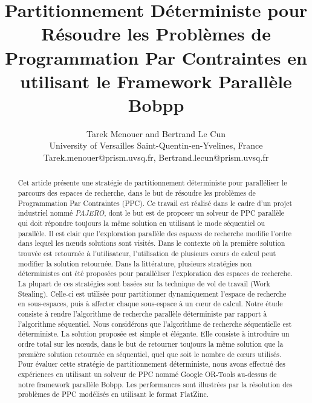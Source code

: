 \documentclass[parallelisme]{compas2014}
\begin{document}
\title{Partitionnement Déterministe pour Résoudre les Problèmes de Programmation Par Contraintes en utilisant le Framework Parallèle Bobpp}
\author{
Tarek Menouer and Bertrand Le Cun\\
University of Versailles Saint-Quentin-en-Yvelines, France \\
Tarek.menouer@prism.uvsq.fr, Bertrand.lecun@prism.uvsq.fr
}

\maketitle

\begin{abstract}
Cet article présente une stratégie de partitionnement déterministe pour paralléliser le parcours des espaces de recherche, dans le but de résoudre les problèmes de Programmation Par Contraintes (PPC). Ce travail est réalisé dans le cadre d'un projet industriel nommé \textit{PAJERO}, dont le but est de proposer un solveur de PPC parallèle qui doit répondre toujours la même solution en utilisant le mode séquentiel ou parallèle.
Il est clair que l'exploration parallèle des espaces de recherche modifie l'ordre dans lequel les nœuds solutions sont visités.
Dans le contexte où la première solution trouvée est retournée à l'utilisateur, l'utilisation de plusieurs cœurs de calcul peut modifier la solution retournée.
Dans la littérature, plusieurs stratégies non déterministes ont été proposées pour paralléliser l'exploration des espaces de recherche. La plupart de ces stratégies sont basées sur la technique de vol de travail (Work Stealing). Celle-ci est utilisée pour partitionner dynamiquement l'espace de recherche en sous-espaces, puis à affecter chaque sous-espace à un cœur de calcul.
Notre étude consiste à rendre l'algorithme de recherche parallèle déterministe par rapport à l'algorithme séquentiel.
Nous considérons que l'algorithme de recherche séquentielle est déterministe. La solution proposée est simple et élégante. Elle consiste à introduire un ordre total sur les nœuds, dans le but de retourner toujours la même solution que la première solution retournée en séquentiel, quel que soit le nombre de cœurs utilisés.
Pour évaluer cette stratégie de partitionnement déterministe, nous avons effectué des expériences en utilisant un solveur de PPC nommé Google OR-Tools au-dessus de notre framework parallèle Bobpp. Les performances sont illustrées par la résolution des problèmes de PPC modélisés en utilisant le format FlatZinc.

\end{abstract}
\end{document}
